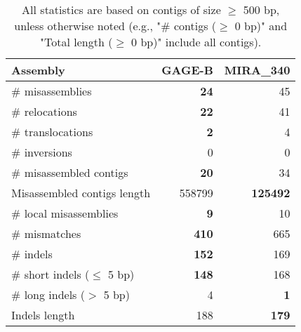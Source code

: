 \documentclass[12pt,a4paper]{article}
\begin{document}
\begin{table}[ht]
\begin{center}
\caption{All statistics are based on contigs of size $\geq$ 500 bp, unless otherwise noted (e.g., "\# contigs ($\geq$ 0 bp)" and "Total length ($\geq$ 0 bp)" include all contigs).}
\begin{tabular}{|l*{2}{|r}|}
\hline
Assembly & GAGE-B & MIRA\_340 \\ \hline
\# misassemblies & {\bf 24} & 45 \\ \hline
\hspace{5mm}\# relocations & {\bf 22} & 41 \\ \hline
\hspace{5mm}\# translocations & {\bf 2} & 4 \\ \hline
\hspace{5mm}\# inversions & 0 & 0 \\ \hline
\# misassembled contigs & {\bf 20} & 34 \\ \hline
Misassembled contigs length & 558799 & {\bf 125492} \\ \hline
\# local misassemblies & {\bf 9} & 10 \\ \hline
\# mismatches & {\bf 410} & 665 \\ \hline
\# indels & {\bf 152} & 169 \\ \hline
\hspace{5mm}\# short indels ($\leq$ 5 bp) & {\bf 148} & 168 \\ \hline
\hspace{5mm}\# long indels ($>$ 5 bp) & 4 & {\bf 1} \\ \hline
Indels length & 188 & {\bf 179} \\ \hline
\end{tabular}
\end{center}
\end{table}
\end{document}
